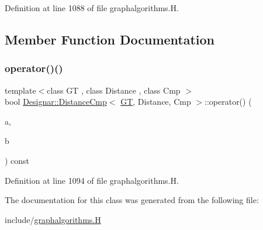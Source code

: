 Definition at line 1088 of file graphalgorithms.\+H.



\subsection{Member Function Documentation}
\mbox{\label{class_designar_1_1_distance_cmp_a5de92b27c64e3493d950a99018d28671}} 
\subsubsection{\texorpdfstring{operator()()}{operator()()}}
{\footnotesize\ttfamily template$<$class GT , class Distance , class Cmp $>$ \\
bool \hyperlink{class_designar_1_1_distance_cmp}{Designar\+::\+Distance\+Cmp}$<$ \hyperlink{demo-buildgraph_8_c_a3001c40d2c31ca87ed96cd7d1334a55e}{GT}, Distance, Cmp $>$\+::operator() (\begin{DoxyParamCaption}\item[{typename G\+T\+::\+Arc \&}]{a,  }\item[{typename G\+T\+::\+Arc \&}]{b }\end{DoxyParamCaption}) const\hspace{0.3cm}{\ttfamily [inline]}}



Definition at line 1094 of file graphalgorithms.\+H.



The documentation for this class was generated from the following file\+:\begin{DoxyCompactItemize}
\item 
include/\hyperlink{graphalgorithms_8_h}{graphalgorithms.\+H}\end{DoxyCompactItemize}
